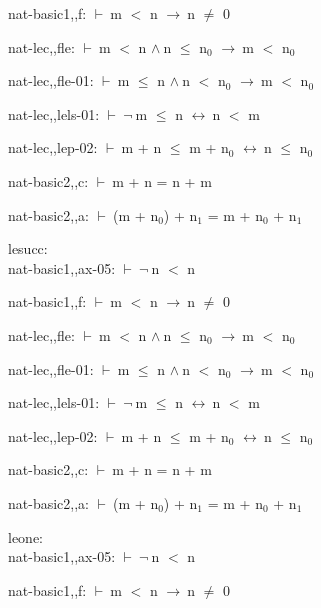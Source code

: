 \documentclass[a4paper]{article}
\newcommand{\Fol}{\mbox{$\vdash\ $}}
\newcommand{\Not}{\mbox{$\neg\ $}}
\newcommand{\And}{\mbox{$\wedge\ $}}
\newcommand{\Imp}{\mbox{$\rightarrow\ $}}
\newcommand{\Equiv}{\mbox{$\leftrightarrow\ $}}
\begin{document}
nat-basic1,,f: 
 \Fol m $<$ n \Imp n $\neq$ 0



nat-lec,,fle: 
 \Fol m $<$ n \And n $\le$ $\mbox{n}_{0}$ \Imp m $<$ $\mbox{n}_{0}$



nat-lec,,fle-01: 
 \Fol m $\le$ n \And n $<$ $\mbox{n}_{0}$ \Imp m $<$ $\mbox{n}_{0}$



nat-lec,,lels-01: 
 \Fol \Not m $\le$ n \Equiv n $<$ m



nat-lec,,lep-02: 
 \Fol m + n $\le$ m + $\mbox{n}_{0}$ \Equiv n $\le$ $\mbox{n}_{0}$



nat-basic2,,c: 
 \Fol m + n = n + m



nat-basic2,,a: 
 \Fol (m + $\mbox{n}_{0}$) + $\mbox{n}_{1}$ = m + $\mbox{n}_{0}$ + $\mbox{n}_{1}$



\bigskip

lesucc:\\ nat-basic1,,ax-05: 
 \Fol \Not n $<$ n



nat-basic1,,f: 
 \Fol m $<$ n \Imp n $\neq$ 0



nat-lec,,fle: 
 \Fol m $<$ n \And n $\le$ $\mbox{n}_{0}$ \Imp m $<$ $\mbox{n}_{0}$



nat-lec,,fle-01: 
 \Fol m $\le$ n \And n $<$ $\mbox{n}_{0}$ \Imp m $<$ $\mbox{n}_{0}$



nat-lec,,lels-01: 
 \Fol \Not m $\le$ n \Equiv n $<$ m



nat-lec,,lep-02: 
 \Fol m + n $\le$ m + $\mbox{n}_{0}$ \Equiv n $\le$ $\mbox{n}_{0}$



nat-basic2,,c: 
 \Fol m + n = n + m



nat-basic2,,a: 
 \Fol (m + $\mbox{n}_{0}$) + $\mbox{n}_{1}$ = m + $\mbox{n}_{0}$ + $\mbox{n}_{1}$



\bigskip

leone:\\ nat-basic1,,ax-05: 
 \Fol \Not n $<$ n



nat-basic1,,f: 
 \Fol m $<$ n \Imp n $\neq$ 0
\end{document}
